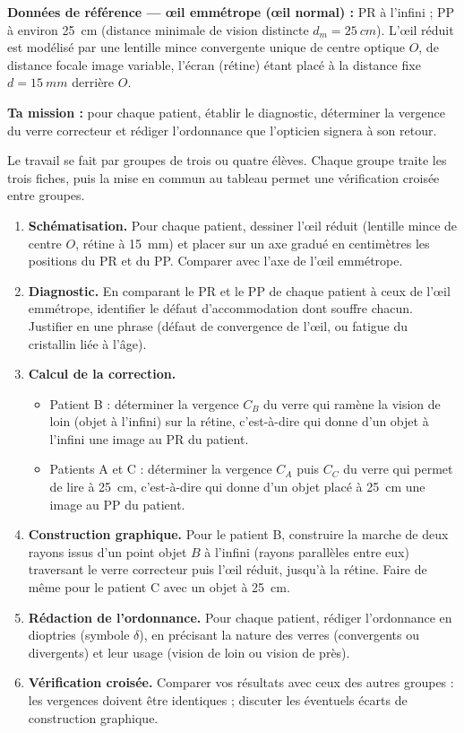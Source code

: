 \documentclass[11pt]{article}
\newcounter{popsec}
\newcounter{popsub}
\newcommand{\courssub}[1]{%
  \stepcounter{popsub}%
  \par\vspace{9pt}\noindent{\popxbold\fontsize{11.5}{13}\selectfont\color{popink}{\color{poporange}\thepopsec.\thepopsub}\hspace{6pt}#1}\par\nopagebreak\vspace{4pt}
}
\begin{document}
\textbf{Données de référence — œil emmétrope (œil normal) :} PR à l'infini ; PP à environ \SI{25}{cm} (distance minimale de vision distincte $d_m = \SI{25}{cm}$). L'œil réduit est modélisé par une lentille mince convergente unique de centre optique $O$, de distance focale image variable, l'écran (rétine) étant placé à la distance fixe $d = \SI{15}{mm}$ derrière $O$.

\textbf{Ta mission :} pour chaque patient, établir le diagnostic, déterminer la vergence du verre correcteur et rédiger l'ordonnance que l'opticien signera à son retour.

\courssub{Consignes}

Le travail se fait par groupes de trois ou quatre élèves. Chaque groupe traite les trois fiches, puis la mise en commun au tableau permet une vérification croisée entre groupes.

\begin{enumerate}
\item \textbf{Schématisation.} Pour chaque patient, dessiner l'œil réduit (lentille mince de centre $O$, rétine à \SI{15}{mm}) et placer sur un axe gradué en centimètres les positions du PR et du PP. Comparer avec l'axe de l'œil emmétrope.
\item \textbf{Diagnostic.} En comparant le PR et le PP de chaque patient à ceux de l'œil emmétrope, identifier le défaut d'accommodation dont souffre chacun. Justifier en une phrase (défaut de convergence de l'œil, ou fatigue du cristallin liée à l'âge).
\item \textbf{Calcul de la correction.}
\begin{itemize}
\item Patient B : déterminer la vergence $C_B$ du verre qui ramène la vision de loin (objet à l'infini) sur la rétine, c'est-à-dire qui donne d'un objet à l'infini une image au PR du patient.
\item Patients A et C : déterminer la vergence $C_A$ puis $C_C$ du verre qui permet de lire à \SI{25}{cm}, c'est-à-dire qui donne d'un objet placé à \SI{25}{cm} une image au PP du patient.
\end{itemize}
\item \textbf{Construction graphique.} Pour le patient B, construire la marche de deux rayons issus d'un point objet $B$ à l'infini (rayons parallèles entre eux) traversant le verre correcteur puis l'œil réduit, jusqu'à la rétine. Faire de même pour le patient C avec un objet à \SI{25}{cm}.
\item \textbf{Rédaction de l'ordonnance.} Pour chaque patient, rédiger l'ordonnance en dioptries (symbole $\delta$), en précisant la nature des verres (convergents ou divergents) et leur usage (vision de loin ou vision de près).
\item \textbf{Vérification croisée.} Comparer vos résultats avec ceux des autres groupes : les vergences doivent être identiques ; discuter les éventuels écarts de construction graphique.
\end{enumerate}
\end{document}
